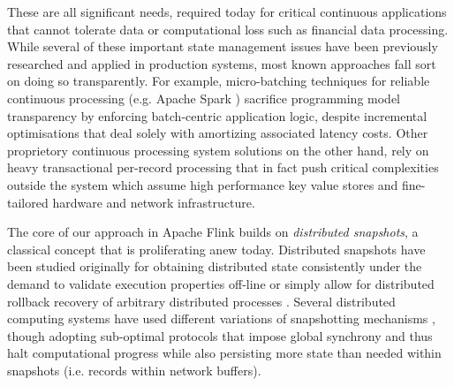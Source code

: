 These are all significant needs, required today for critical continuous applications that cannot tolerate data or computational loss such as financial data processing. 
 While several of these important state management issues have been previously researched and applied in production systems, most known approaches fall sort on doing so transparently. For example, micro-batching techniques for reliable continuous processing (e.g. Apache Spark \cite{zaharia2012discretized}) sacrifice programming model transparency by enforcing batch-centric application logic, despite incremental optimisations \cite{venkataramandrizzle} that deal solely with amortizing associated latency costs. Other proprietory continuous processing system solutions \cite{millwheel} on the other hand, rely on heavy transactional per-record processing that in fact push critical complexities outside the system which assume high performance key value stores and fine-tailored hardware and network infrastructure. 


The core of our approach in Apache Flink builds on \emph{distributed snapshots}, a  classical concept that is proliferating anew today. Distributed snapshots have been studied originally for obtaining distributed state consistently under the demand to validate execution properties off-line or simply allow for distributed rollback recovery of arbitrary distributed processes \cite{elnozahy2002survey}. Several distributed computing systems have used different variations of snapshotting mechanisms \cite{murray2013naiad,low2012distributed}, though adopting sub-optimal protocols that impose global synchrony and thus halt computational progress while also persisting more state than needed within snapshots (i.e. records within network buffers).


